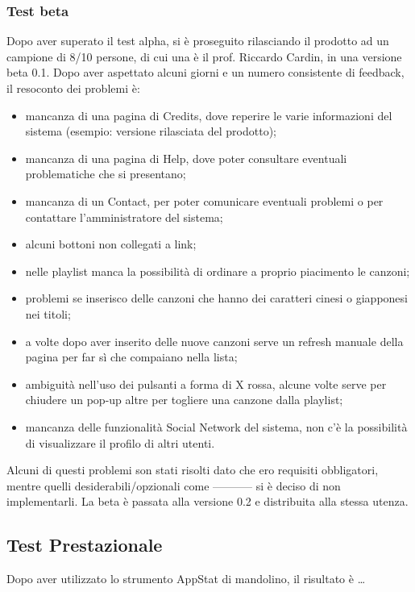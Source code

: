\subsubsection{Test beta}
Dopo aver superato il test alpha, si \`e proseguito rilasciando il prodotto ad
un campione di 8/10 persone, di cui una \`e il prof. Riccardo Cardin, in una
versione beta 0.1. Dopo aver aspettato alcuni giorni e un numero consistente di
feedback, il resoconto dei problemi \`e:
\begin{itemize}
  \item mancanza di una pagina di Credits, dove reperire le varie informazioni
  del sistema (esempio: versione rilasciata del prodotto); 
  \item mancanza di una pagina di Help, dove poter consultare eventuali
  problematiche che si presentano;
  \item mancanza di un Contact, per poter comunicare eventuali problemi o
  per contattare l'amministratore del sistema;
  \item alcuni bottoni non collegati a link;
  \item nelle playlist manca la possibilit\`a di ordinare a proprio piacimento
  le canzoni;
  \item problemi se inserisco delle canzoni che hanno dei caratteri cinesi o
  giapponesi nei titoli;
  \item a volte dopo aver inserito delle nuove canzoni serve un refresh manuale
  della pagina per far s\`i che compaiano nella lista;
  \item ambiguit\`a nell'uso dei pulsanti a forma di X rossa, alcune volte serve
  per chiudere un pop-up altre per togliere una canzone dalla playlist;
  \item mancanza delle funzionalit\`a Social Network del sistema, non c'\`e la
  possibilit\`a di visualizzare il profilo di altri utenti.
\end{itemize}
Alcuni di questi problemi son stati risolti dato che ero requisiti obbligatori,
mentre quelli desiderabili/opzionali come ----------- si \`e deciso di non
implementarli.
La beta \`e passata alla versione 0.2 e distribuita alla stessa utenza.

\subsection{Test Prestazionale}
Dopo aver utilizzato lo strumento AppStat di mandolino, il risultato \`e \ldots




